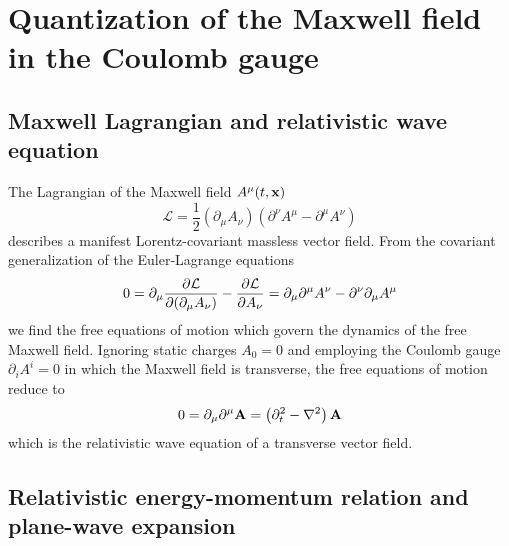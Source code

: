 \section{Quantization of the Maxwell field in the Coulomb gauge}


\subsection{Maxwell Lagrangian and relativistic wave equation}

The Lagrangian of the Maxwell field $A^\mu(t,\vb{x})$~\cite[p.~339]{Srednicki2007}
\begin{equation}
	\mathcal{L}
	=
	\frac{1}{2}
	(\partial_\mu A_\nu)
	\left(
		\partial^\nu A^\mu
		-
		\partial^\mu A^\nu
	\right)
\end{equation}
describes a manifest Lorentz-covariant massless vector field.
From the covariant generalization of the Euler-Lagrange equations
\begin{equation}
	0
	=
	\partial_\mu
	\pdv{\mathcal{L}}{(\partial_\mu A_\nu)}
	-
	\pdv{\mathcal{L}}{A_\nu}
	=
	\partial_\mu\partial^\mu A^\nu
	-
	\partial^\nu\partial_\mu A^\mu
\end{equation}
we find the free equations of motion which govern the dynamics of the free Maxwell field.
Ignoring static charges $A_0=0$ and employing the Coulomb gauge $\partial_iA^i=0$ in which the Maxwell field is transverse, the free equations of motion reduce to
\begin{equation}
	0
	=
	\partial_\mu\partial^\mu
	\vb{A}
	=
	\left(
		\partial_t^2
		-
		\laplacian
	\right)
	\vb{A}
\end{equation}
which is the relativistic wave equation of a transverse vector field.

\subsection{Relativistic energy-momentum relation and plane-wave expansion}

